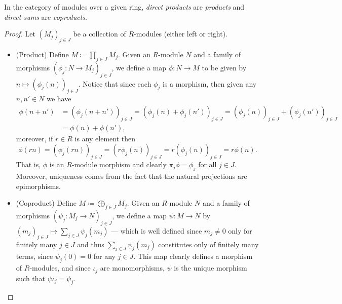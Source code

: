 \begin{theorem}
\label{thm:direct-sum-product-and-coproduct}
In the category of modules over a given ring, \emph{direct products} are
\emph{products} and \emph{direct sums} are \emph{coproducts}.
\end{theorem}

\begin{proof}
Let \((M_j)_{j \in J}\) be a collection of \(R\)-modules (either left or
right).
\begin{itemize}\setlength\itemsep{0em}
\item (Product) Define \(M \coloneq \prod_{j \in J} M_j\). Given an \(R\)-module
  \(N\) and a family of morphisms \((\phi_j: N \to M_j)_{j \in J}\), we define a
  map \(\phi: N \to M\) to be given by \(n \mapsto (\phi_j(n))_{j \in
    J}\). Notice that since each \(\phi_j\) is a morphism, then given any
  \(n, n' \in N\) we have
  \begin{align*}
    \phi(n + n')
    &= (\phi_j(n + n'))_{j \in J}
      = (\phi_j(n) + \phi_j(n'))_{j \in J}
      = (\phi_j(n))_{j \in J} + (\phi_j(n'))_{j \in J} \\
    &= \phi(n) + \phi(n'),
  \end{align*}
  moreover, if \(r \in R\) is any element then
  \[
    \phi(r n)
      = (\phi_j(r n))_{j \in J}
      = (r \phi_j(n))_{j \in J}
      = r (\phi_j(n))_{j \in J}
      = r \phi(n).
  \]
  That is, \(\phi\) is an \(R\)-module morphism and clearly \(\pi_j \phi =
  \phi_j\) for all \(j \in J\). Moreover, uniqueness comes from the fact that
  the natural projections are epimorphisms.

\item (Coproduct) Define \(M \coloneq \bigoplus_{j \in J} M_j\). Given an
  \(R\)-module \(N\) and a family of morphisms
  \((\psi_j: M_j \to N)_{j \in J}\), we define a map \(\psi: M \to N\) by
  \((m_j)_{j \in J} \mapsto \sum_{j \in J} \psi_j(m_j)\) --- which is well
  defined since \(m_j \neq 0\) only for finitely many \(j \in J\) and thus
  \(\sum_{j \in J} \psi_j(m_j)\) constitutes only of finitely many terms, since
  \(\psi_j(0) = 0\) for any \(j \in J\). This map clearly defines a morphism of
  \(R\)-modules, and since \(\iota_j\) are monomorphisms, \(\psi\) is the unique
  morphism such that \(\psi \iota_j = \psi_{j}\).
\end{itemize}
\end{proof}


